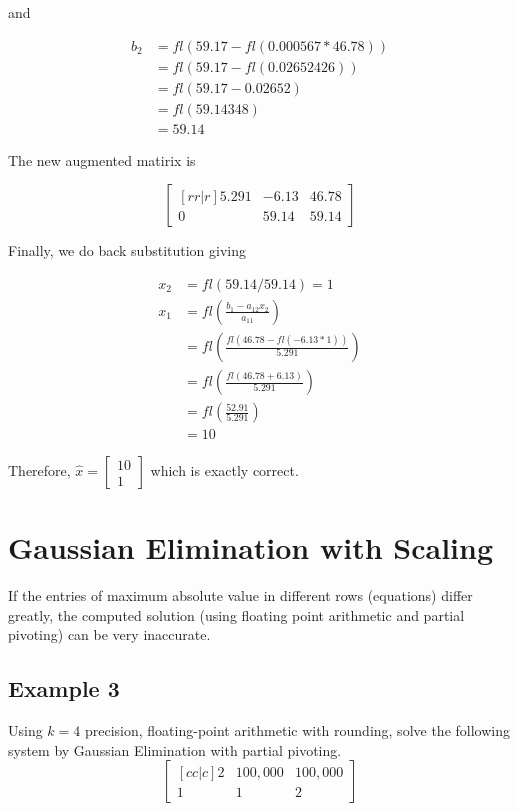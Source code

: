 \documentclass [titlepage,12pt,letter] {article}
\begin{document}
and

\begin{align*}
b_2&=fl(59.17-fl(0.000567*46.78)) \\
&=fl(59.17-fl(0.02652426)) \\
&=fl(59.17-0.02652) \\
&=fl(59.14348) \\
&=59.14
\end{align*}

The new augmented matirix is

\[
\begin{bmatrix}[rr|r]
	5.291		&	-6.13	&	46.78 \\
	0	&	59.14	&	59.14
\end{bmatrix}
\]

Finally, we do back substitution giving

\begin{align*}
x_2&=fl(59.14/59.14)=1 \\
x_1&=fl\left(\frac{b_1-a_{12}x_2}{a_{11}}\right) \\
&=fl\left(\frac{fl(46.78-fl(-6.13*1))}{5.291}\right) \\
&=fl\left(\frac{fl(46.78+6.13)}{5.291}\right) \\
&= fl\left(\frac{52.91}{5.291}\right) \\
&= 10
\end{align*}

Therefore, $\hat{x}=\begin{bmatrix} 10 \\ 1 \end{bmatrix}$ which is exactly correct.

\section{Gaussian Elimination with Scaling}

If the entries of maximum absolute value in different rows (equations) differ greatly, the computed solution (using floating point arithmetic and partial pivoting) can be very inaccurate.

\subsection{Example 3} Using $k=4$ precision, floating-point arithmetic with rounding, solve the following system by Gaussian Elimination with partial pivoting.
\[
\begin{bmatrix}[cc|c]
  2  &  100,000 & 100,000 \\
  1  &  1  &  2
\end{bmatrix}
\]
\end{document}
